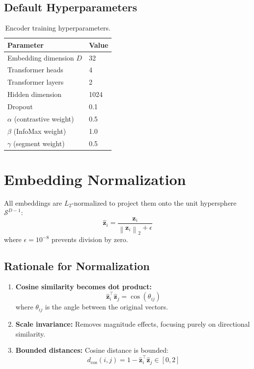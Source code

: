 \documentclass[11pt,a4paper]{article}
\newcommand{\vect}[1]{\mathbf{#1}}
\newcommand{\set}[1]{\mathcal{#1}}
\newcommand{\norm}[1]{\left\|#1\right\|}
\begin{document}
\subsection{Default Hyperparameters}

\begin{table}[h]
\centering
\begin{tabular}{@{}ll@{}}
\toprule
\textbf{Parameter} & \textbf{Value} \\
\midrule
Embedding dimension $D$ & 32 \\
Transformer heads & 4 \\
Transformer layers & 2 \\
Hidden dimension & 1024 \\
Dropout & 0.1 \\
$\alpha$ (contrastive weight) & 0.5 \\
$\beta$ (InfoMax weight) & 1.0 \\
$\gamma$ (segment weight) & 0.5 \\
\bottomrule
\end{tabular}
\caption{Encoder training hyperparameters.}
\end{table}

\section{Embedding Normalization}

All embeddings are $L_2$-normalized to project them onto the unit hypersphere $\set{S}^{D-1}$:
\begin{equation}
    \hat{\vect{z}}_i = \frac{\vect{z}_i}{\norm{\vect{z}_i}_2 + \epsilon}
\end{equation}
where $\epsilon = 10^{-8}$ prevents division by zero.

\subsection{Rationale for Normalization}

\begin{enumerate}
    \item \textbf{Cosine similarity becomes dot product:}
    \begin{equation}
        \hat{\vect{z}}_i^\top \hat{\vect{z}}_j = \cos(\theta_{ij})
    \end{equation}
    where $\theta_{ij}$ is the angle between the original vectors.
    
    \item \textbf{Scale invariance:} Removes magnitude effects, focusing purely on directional similarity.
    
    \item \textbf{Bounded distances:} Cosine distance is bounded:
    \begin{equation}
        d_{\cos}(i, j) = 1 - \hat{\vect{z}}_i^\top \hat{\vect{z}}_j \in [0, 2]
    \end{equation}
\end{enumerate}
\end{document}
